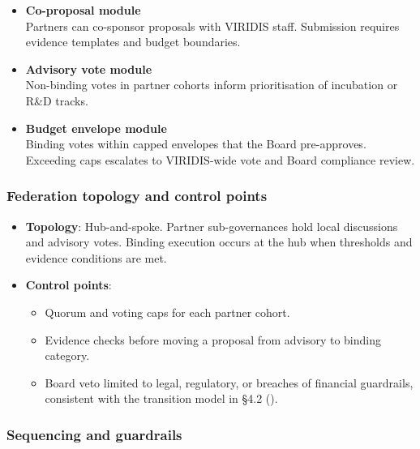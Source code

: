 \documentclass[
  english,
  12pt,
  oneside,
  open=any]{scrbook}
\providecommand{\tightlist}{%
  \setlength{\itemsep}{0pt}\setlength{\parskip}{0pt}}\usepackage{longtable,booktabs,array}
\begin{document}
\begin{itemize}
\tightlist
\item
  \textbf{Co-proposal module}\\
  Partners can co-sponsor proposals with VIRIDIS staff. Submission
  requires evidence templates and budget boundaries.
\item
  \textbf{Advisory vote module}\\
  Non-binding votes in partner cohorts inform prioritisation of
  incubation or R\&D tracks.
\item
  \textbf{Budget envelope module}\\
  Binding votes within capped envelopes that the Board pre-approves.
  Exceeding caps escalates to VIRIDIS-wide vote and Board compliance
  review.
\end{itemize}

\subsubsection{Federation topology and control
points}\label{federation-topology-and-control-points}

\begin{itemize}
\tightlist
\item
  \textbf{Topology}: Hub-and-spoke. Partner sub-governances hold local
  discussions and advisory votes. Binding execution occurs at the hub
  when thresholds and evidence conditions are met.
\item
  \textbf{Control points}:

  \begin{itemize}
  \tightlist
  \item
    Quorum and voting caps for each partner cohort.\\
  \item
    Evidence checks before moving a proposal from advisory to binding
    category.\\
  \item
    Board veto limited to legal, regulatory, or breaches of financial
    guardrails, consistent with the transition model in §4.2
    ().
  \end{itemize}
\end{itemize}

\subsubsection{Sequencing and
guardrails}\label{sequencing-and-guardrails}
\end{document}
